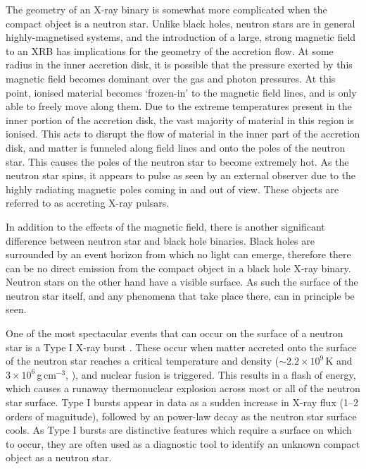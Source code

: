 \label{sec:NSintro}

\par The geometry of an X-ray binary is somewhat more complicated when the compact object is a neutron star.  Unlike black holes, neutron stars are in general highly-magnetised systems, and the introduction of a large, strong magnetic field to an XRB has implications for the geometry of the accretion flow.  At some radius in the inner accretion disk, it is possible that the pressure exerted by this magnetic field becomes dominant over the gas and photon pressures.  At this point, ionised material becomes `frozen-in' to the magnetic field lines, and is only able to freely move along them.  Due to the extreme temperatures present in the inner portion of the accretion disk, the vast majority of material in this region is ionised.  This acts to disrupt the flow of material in the inner part of the accretion disk, and matter is funneled along field lines and onto the poles of the neutron star.  This causes the poles of the neutron star to become extremely hot.  As the neutron star spins, it appears to pulse as seen by an external observer due to the highly radiating magnetic poles coming in and out of view.  These objects are referred to as accreting X-ray pulsars.
\par In addition to the effects of the magnetic field, there is another significant difference between neutron star and black hole binaries.  Black holes are surrounded by an event horizon from which no light can emerge, therefore there can be no direct emission from the compact object in a black hole X-ray binary.  Neutron stars on the other hand have a visible surface.  As such the surface of the neutron star itself, and any phenomena that take place there, can in principle be seen.
\par One of the most spectacular events that can occur on the surface of a neutron star is a Type I X-ray burst \citep{Grindlay_TypeI}.  These occur when matter accreted onto the surface of the neutron star reaches a critical temperature and density ($\sim2.2\times10^9$\,K and $3\times10^6$\,g\,cm$^{-3}$, \citealp{Joss_TypeI}), and nuclear fusion is triggered.  This results in a flash of energy, which causes a runaway thermonuclear explosion across most or all of the neutron star surface.  Type I bursts appear in data as a sudden increase in X-ray flux (1--2 orders of magnitude), followed by an power-law decay as the neutron star surface cools.  As Type I bursts are distinctive features which require a surface on which to occur, they are often used as a diagnostic tool to identify an unknown compact object as a neutron star.

